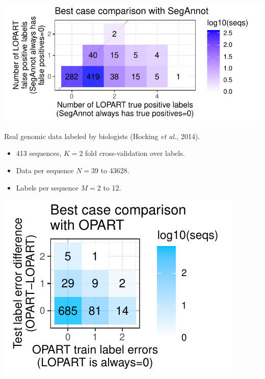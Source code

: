 \documentclass{beamer}
\begin{document}
\begin{frame}
  \includegraphics[width=\textwidth]{figure-label-errors-SegAnnot}

  Real genomic data labeled by biologists (Hocking
  \emph{et al.}, 2014).
  \begin{itemize}
  \item 413 sequences, $K=2$ fold cross-validation over labels.
  \item Data per sequence $N=39$ to 43628.
  \item Labels per sequence $M=2$ to 12.
  \end{itemize}
\end{frame}

\begin{frame}
  \includegraphics[width=\textwidth]{figure-label-errors}
\end{frame}
 
\end{document}
